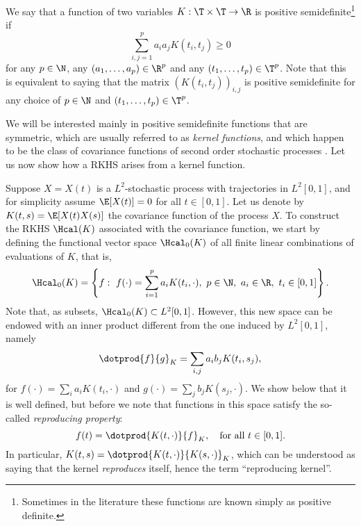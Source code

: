 \begin{definition}
  We say that a function of two variables \(K: \T \times \T \to \R\) is positive semidefinite\footnote{Sometimes in the literature these functions are known simply as positive definite.} if
  \[
    \sum_{i,j=1}^p a_ia_jK(t_i, t_j) \geq 0
  \]
  for any \(p\in\N\), any \((a_1,\dots, a_p)\in \R^p\) and any \((t_1,\dots, t_p)\in\T^p\). Note that this is equivalent to saying that the matrix \((K(t_i, t_j))_{i,j}\) is positive semidefinite for any choice of \(p\in\N\) and \((t_1,\dots, t_p)\in\T^p\).
\end{definition}

We will be interested mainly in positive semidefinite functions that are symmetric, which are usually referred to as \textit{kernel functions}, and which happen to be the class of covariance functions of second order stochastic processes \citep[][Th. 27]{berlinet2004reproducing}. Let us now show how a RKHS arises from a kernel function.

Suppose \(X=X(t)\) is a \(L^2\)-stochastic process with trajectories in \(L^2[0, 1]\), and for simplicity assume \(\E[X(t)]=0\) for all \(t\in[0,1]\). Let us denote by \(K(t, s)= \E[X(t)X(s)]\) the covariance function of the process \(X\). To construct the RKHS \(\Hcal(K)\) associated with the covariance function, we start by defining the functional vector space \(\Hcal_0(K)\) of all finite linear combinations of evaluations of \(K\), that is,
\begin{equation}\label{eq:h0}
\Hcal_0(K) = \left\{ f: \ f(\cdot) = \sum_{i=1}^p a_i K(t_i, \cdot), \ p \in \N, \ a_i \in \R, \ t_i \in [0, 1] \right\}.
\end{equation}
Note that, as subsets, \(\Hcal_0(K)\subset L^2[0,1]\). However, this new space can be endowed with an inner product different from the one induced by \(L^2[0,1]\), namely
\[
\dotprod{f}{g}_K = \sum_{i, j} a_i b_j K(t_i, s_j),
\]
for \(f(\cdot)=\sum_i a_i K(t_i, \cdot) \) and \(g(\cdot)=\sum_j b_j K(s_j, \cdot)\). We show below that it is well defined, but before we note that functions in this space satisfy the so-called \textit{reproducing property}:
\[
f(t) = \dotprod{K(t, \cdot)}{f}_K, \quad \text{for all } t \in [0, 1].
\]
In particular, \(K(t, s)=\dotprod{K(t, \cdot)}{K(s, \cdot)}_K\), which can be understood as saying that the kernel \textit{reproduces} itself, hence the term ``reproducing kernel''.

